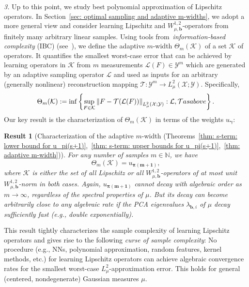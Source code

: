 \documentclass[namedate,webpdf]{ima-authoring-template-blank}
\newcommand*{\nm}[1]{{\left\|#1\right \|}}
\numberwithin{counter}{section}
\numberwithin{equation}{section}
\theoremstyle{plain}
\newtheorem{result}{Result}
\theoremstyle{definition}
\newcommand*{\cK}{\mathcal{K}}
\newcommand*{\cL}{\mathcal{L}}
\newcommand*{\cT}{\mathcal{T}}
\newcommand*{\cX}{\mathcal{X}}
\newcommand*{\cY}{\mathcal{Y}}
\newcommand*{\bbN}{\mathbb{N}}
\theoremstyle{thmstyletwo}
\begin{document}
\noindent\textit{3.}
Up to this point, we study best polynomial approximation of Lipschitz operators. In Section~\ref{sec: optimal sampling and adaptive m-widths}, we adopt a more general view and consider learning Lipschitz and \(W_{\mu, \bm{b}}^{1, 2}\)-operators from finitely many arbitrary linear samples. Using tools from~\emph{information-based complexity} (IBC) (see~\citet{novak_TractabilityMultivariateProblemsVolume_2008}), we define the adaptive \(m\)-width \(\Theta_m(\cK)\) of a set  \(\cK\) of operators. It quantifies the smallest worst-case error that can be achieved by learning operators in \(\cK\) from \(m\) measurements \(\cL(F) \in \cY^m\) which are generated by an adaptive sampling operator \(\cL\) and used as inputs for an arbitrary (generally nonlinear) reconstruction mapping \(\cT: \cY^m \to L_{\mu}^2(\cX; \cY)\). Specifically,
\[
\Theta_m(\cK)
:= \inf\left\{\sup_{F \in \cK} \nm{F - \cT(\cL(F))}_{L_{\mu}^2(\cX; \cY)}: \cL, \cT \textup{ as above} \right\}.
\]
Our key result is the characterization of \(\Theta_m(\cK)\) in terms of the weights \(u_{\bm{\gamma}}\):
\begin{result}[Characterization of the adaptive \(m\)-width (Theorems~\ref{thm: s-term: lower bound for u_pi(s+1)},~\ref{thm: s-term: upper bounds for u_pi(s+1)},~\ref{thm: adaptive m-width})]
\label{res: adaptive m-width; informal}
    For any number of samples \(m \in \bbN\), we have
    \[
    \Theta_m(\cK) = u_{\bm{\pi(m + 1)}},
    \]
    where \(\cK\) is either the set of all Lipschitz or all \(W_{\mu, \bm{b}}^{1,2}\)-operators of at most unit \(W_{\mu, \bm{b}}^{1,2}\)-norm in both cases. Again, \(u_{\bm{\pi(m + 1)}}\) cannot decay with algebraic order as \(m \rightarrow \infty\), regardless of the spectral properties of \(\mu\). But its decay can become arbitrarily close to any algebraic rate if the PCA eigenvalues \(\lambda_{\bm{b}, i}\) of \(\mu\) decay sufficiently fast (e.g., double exponentially).
\end{result}
This result tightly characterizes the sample complexity of learning Lipschitz operators and gives rise to the following \emph{curse of sample complexity}: No procedure (e.g., NNs, polynomial approximation, random features, kernel methods, etc.) for learning Lipschitz operators can achieve algebraic convergence rates for the smallest worst-case \(L_{\mu}^2\)-approximation error. This holds for general (centered, nondegenerate) Gaussian measures \(\mu\).
\end{document}
